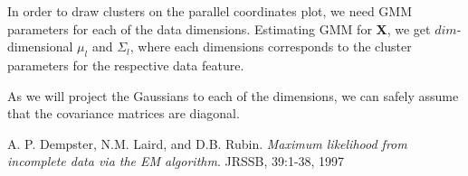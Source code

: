 \documentclass[10pt,a4paper]{article}
\begin{document}
In order to draw clusters on the parallel coordinates plot, we need GMM parameters for each of the data dimensions. Estimating GMM for {\bf X}, we get $dim$-dimensional $\mu_l$ and $\Sigma_l$, where each dimensions corresponds to the cluster parameters for the respective data feature. 





As we will project the Gaussians to each of the dimensions, we can safely assume that the covariance matrices are diagonal.







\begin{thebibliography}{9}

  A. P. Dempster, N.M. Laird, and D.B. Rubin.
  \emph{Maximum likelihood from incomplete data via the EM algorithm}.
  JRSSB, 39:1-38,
  1997
\end{thebibliography}
\end{document}
